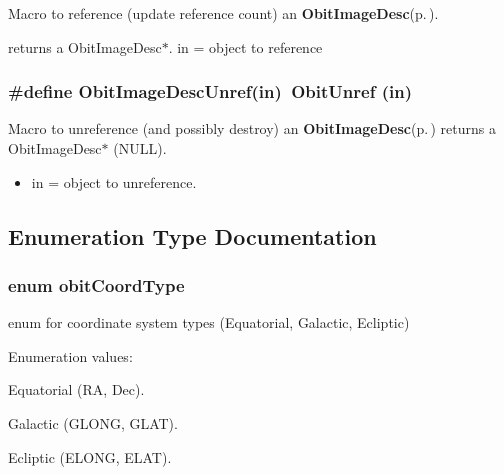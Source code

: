 Macro to reference (update reference count) an {\bf Obit\-Image\-Desc}{\rm (p.\,\pageref{structObitImageDesc})}. 

returns a Obit\-Image\-Desc$\ast$. in = object to reference 
\subsubsection{\setlength{\rightskip}{0pt plus 5cm}\#define Obit\-Image\-Desc\-Unref(in)\ Obit\-Unref (in)}\label{ObitImageDesc_8h_a0}


Macro to unreference (and possibly destroy) an {\bf Obit\-Image\-Desc}{\rm (p.\,\pageref{structObitImageDesc})} returns a Obit\-Image\-Desc$\ast$ (NULL). 

\begin{itemize}
\item in = object to unreference. \end{itemize}


\subsection{Enumeration Type Documentation}
\subsubsection{\setlength{\rightskip}{0pt plus 5cm}enum {\bf obit\-Coord\-Type}}\label{ObitImageDesc_8h_a24}


enum for coordinate system types (Equatorial, Galactic, Ecliptic) 

\begin{Desc}
\item[Enumeration values: ]\par
\begin{description}
\item[{\em 
OBIT\_\-Equatorial\label{ObitImageDesc_8h_a24a6}
}]Equatorial (RA, Dec). \item[{\em 
OBIT\_\-Galactic\label{ObitImageDesc_8h_a24a7}
}]Galactic (GLONG, GLAT). \item[{\em 
OBIT\_\-Ecliptic\label{ObitImageDesc_8h_a24a8}
}]Ecliptic (ELONG, ELAT). \end{description}
\end{Desc}



